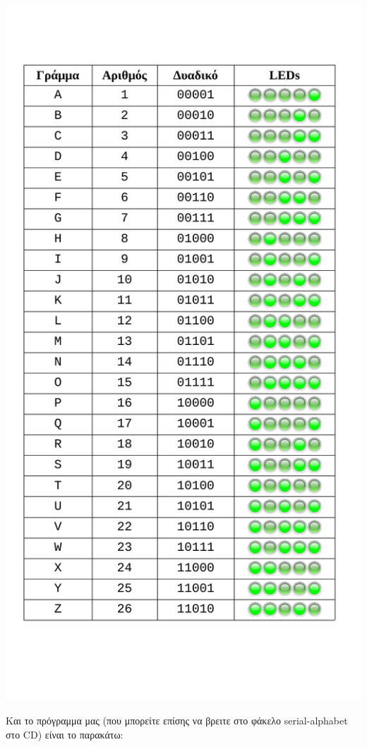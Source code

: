 \documentclass[a4paper,twoside,12pt]{article}
\begin{document}
\begin{center}
  \includegraphics[width=1.0\textwidth]{images/main/led-table}
\end{center}

Και το πρόγραμμα μας (που μπορείτε επίσης να βρειτε στο φάκελο serial-alphabet στο CD) είναι το παρακάτω:
\end{document}
